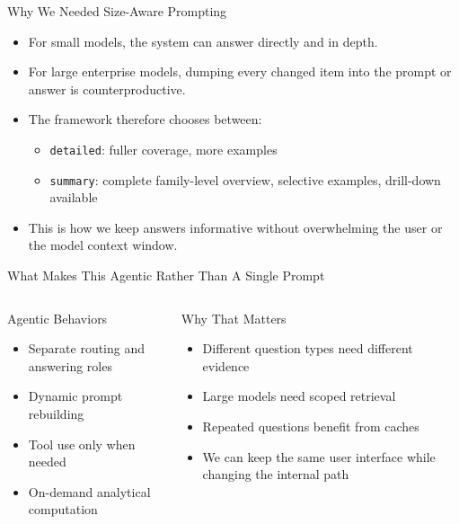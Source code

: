 \documentclass[10pt]{beamer}
\newcommand{\goodbox}[2]{
  \begin{block}{#1}
  #2
  \end{block}
}
\newcommand{\func}[1]{\texttt{#1}}
\begin{document}
\begin{frame}{Why We Needed Size-Aware Prompting}
  \begin{itemize}
    \item For small models, the system can answer directly and in depth.
    \item For large enterprise models, dumping every changed item into the prompt or answer is counterproductive.
    \item The framework therefore chooses between:
    \begin{itemize}
      \item \func{detailed}: fuller coverage, more examples
      \item \func{summary}: complete family-level overview, selective examples, drill-down available
    \end{itemize}
    \item This is how we keep answers informative without overwhelming the user or the model context window.
  \end{itemize}
\end{frame}

\begin{frame}{What Makes This Agentic Rather Than A Single Prompt}
  \begin{columns}[T]
    \goodbox{Agentic Behaviors}{
      \begin{itemize}
        \item Separate routing and answering roles
        \item Dynamic prompt rebuilding
        \item Tool use only when needed
        \item On-demand analytical computation
      \end{itemize}
    }
    \goodbox{Why That Matters}{
      \begin{itemize}
        \item Different question types need different evidence
        \item Large models need scoped retrieval
        \item Repeated questions benefit from caches
        \item We can keep the same user interface while changing the internal path
      \end{itemize}
    }
  \end{columns}
\end{frame}
\end{document}
